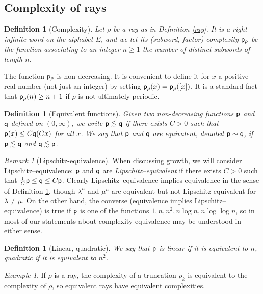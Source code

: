 \documentclass[11pt]{amsart}
\newtheorem{dfn}[thm]{Definition}
\theoremstyle{remark}
\newtheorem{rem}[thm]{Remark}
\newtheorem{example}[thm]{Example}
\newcommand{\cp}{{\sf  p}}
\newcommand{\cq}{{\sf  q}}
\begin{document}
\subsection{Complexity of rays}


\begin{dfn}[Complexity] Let $\rho$ be a ray as in Definition \ref{ray}.
It is a right-infinite word on the alphabet $E$, and we
  let its  (subword, factor) complexity $\cp_\rho$ be the function associating to an integer $n\ge1$ the number of distinct subwords of length $n$.
\end{dfn}

The function $\cp_\rho$ is non-decreasing. It is convenient to   define it for $x$ a positive real number (not just an integer)  by setting $\cp_\rho(x)= \cp_\rho([x])$. It is a standard fact  \cite{morse} 
that $\cp_\rho(n)\ge n+1$ if $\rho$ is not ultimately periodic.

\begin{dfn}[Equivalent functions]\label{eqco}
  Given two non-decreasing functions $\cp $ and $\cq $ defined on $(0,\infty)$, we write $\cp\lesssim \cq$ if there exists $C>0$ such that $\cp(x)\le C\cq(Cx)$   for all $x$.
 We say that $\cp$ and $\cq$  
are equivalent, denoted $\cp\sim \cq$, if $\cp\lesssim \cq$ and $\cq\lesssim \cp$.


\end{dfn}

\begin{rem} [Lipschitz-equivalence]
\label{equiv2}
   When discussing growth, we will consider Lipschitz--equivalence: $\cp$ and $\cq$ are \emph{Lipschitz--equivalent} if there exists $C>0$ such that $\frac1C \cp\le \cq\le C\cp$. 
  Clearly Lipschitz--equivalence implies equivalence in the sense of  Definition \ref{eqco}, though $\lambda^n$ and $\mu^n$ are equivalent but not Lipschitz-equivalent for $\lambda\ne\mu$. On the other hand, the converse (equivalence implies Lipschitz--equivalence) is true if 
$\cp$ is one of the functions $1,n,n^2,n\log n,n\log\log n$, so in most of our statements about complexity equivalence may be understood in either sense.  
\end{rem}

\begin{dfn}[Linear, quadratic]
  We say that $\cp$ is \emph{linear} if it is equivalent to $n$, \emph{quadratic} if it is equivalent to $n^2$. 
\end{dfn}


\begin{example}
 If $\rho$ is a ray, the complexity of a truncation $\rho_k$ is equivalent to the complexity of $\rho$, so equivalent rays have equivalent complexities.
\end{example}
\end{document}
